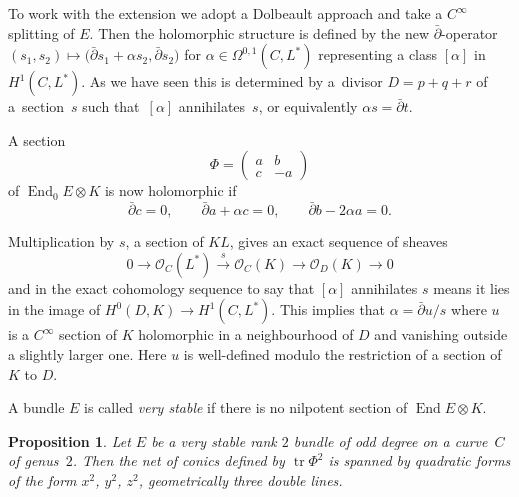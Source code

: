 \documentclass[pdftex]{sigma}
\numberwithin{equation}{section}
\newtheorem{Proposition}[Theorem]{Proposition}
 { \theoremstyle{definition}
\newtheorem{Remark}[Theorem]{Remark} }
\begin{document}
To work with the extension we adopt a Dolbeault approach and take a $C^{\infty}$ splitting of $E$. Then
 the holomorphic structure is defined by the new $\bar\partial$-operator $(s_1,s_2)\mapsto \big(\bar\partial s_1+\alpha s_2, \bar\partial s_2\big)$
for $\alpha\in \Omega^{0,1}(C,L^*)$ representing a class $[\alpha]$ in $H^1(C,L^*)$. As we have seen this is determined by a~divisor $D=p+q+r$ of a~section~$s$ such that~$[\alpha]$ annihilates~$s$, or equivalently $\alpha s=\bar\partial t$.

A section
\[\Phi=\begin{pmatrix}a & b\\
c & -a\end{pmatrix}\] of $\operatorname{End}_0E\otimes K$ is now holomorphic if
\begin{equation}
\bar\partial c=0,\qquad \bar\partial a+\alpha c=0,\qquad \bar\partial b - 2\alpha a=0.
\label{holo}
\end{equation}

Multiplication by $s$, a section of $KL$, gives an exact sequence of sheaves
\begin{displaymath}0\rightarrow \mathcal{O}_C(L^*)\stackrel{s}\rightarrow \mathcal{O}_C(K)\rightarrow \mathcal{O}_D(K)\rightarrow 0\end{displaymath}
and in the exact cohomology sequence to say that $[\alpha]$ annihilates $s$ means it lies in the image of $H^0(D, K)\rightarrow H^1(C,L^*)$. This implies that
 $\alpha=\bar\partial u/s$ where $u$ is a $C^{\infty}$ section of $K$ holomorphic in a neighbourhood of $D$ and vanishing outside a slightly larger one. Here $u$ is well-defined modulo the restriction of a section of $K$ to $D$.

A bundle $E$ is called {\it very stable} if there is no nilpotent section of $\operatorname{End} E\otimes K$.

\begin{Proposition} Let $E$ be a very stable rank $2$ bundle of odd degree on a curve~$C$ of genus~$2$. Then the net of conics defined by $\operatorname{tr} \Phi^2$ is spanned by quadratic forms of the form $x^2$, $y^2$, $z^2$, geometrically three double lines.
\end{Proposition}
\end{document}
